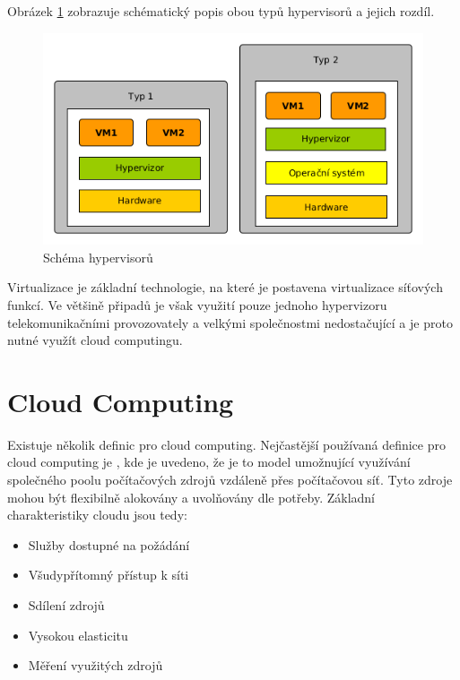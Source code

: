 Obrázek \ref{fig:virtualization} zobrazuje schématický popis obou typů hypervisorů a jejich rozdíl.

\begin{figure}[h]
\begin{centering}
\includegraphics[scale=0.5]{images/virtualization}
\par\end{centering}
\caption{Schéma hypervisorů \label{fig:virtualization}}
\end{figure}

Virtualizace je základní technologie, na které je postavena virtualizace síťových funkcí. Ve většině připadů je však využití pouze jednoho hypervizoru telekomunikačními provozovately a velkými společnostmi nedostačující a je proto nutné využít cloud computingu.

\section{Cloud Computing}

Existuje několik definic pro cloud computing. Nejčastější používaná definice pro cloud computing je \cite{nist_definition}, kde je uvedeno, že je to  model umožnující využívání společného poolu počítačových zdrojů vzdáleně přes počítačovou síť. Tyto zdroje mohou být flexibilně alokovány a uvolňovány dle potřeby. Základní charakteristiky cloudu jsou tedy:

\begin{itemize}
\item Služby dostupné na požádání
\item Všudypřítomný přístup k síti
\item Sdílení zdrojů
\item Vysokou elasticitu
\item Měření využitých zdrojů
\end{itemize}

